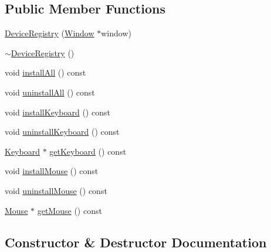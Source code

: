 \subsection*{Public Member Functions}
\begin{DoxyCompactItemize}
\item 
\mbox{\hyperlink{classec_1_1_device_registry_adbe0912caca04d8c401f58b57dc11524}{Device\+Registry}} (\mbox{\hyperlink{classec_1_1_window}{Window}} $\ast$window)
\item 
\mbox{\hyperlink{classec_1_1_device_registry_a75dff0df1527fe9d7e75b25f3dff4028}{$\sim$\+Device\+Registry}} ()
\item 
void \mbox{\hyperlink{classec_1_1_device_registry_a344190c579b44d1238538edb06acd7d7}{install\+All}} () const
\item 
void \mbox{\hyperlink{classec_1_1_device_registry_ab5dc2383c4d5c6f8458f8be914dc7982}{uninstall\+All}} () const
\item 
void \mbox{\hyperlink{classec_1_1_device_registry_aae6852074dd4602f225b1358a2d3d814}{install\+Keyboard}} () const
\item 
void \mbox{\hyperlink{classec_1_1_device_registry_a1ff6b28edf3073f0a483a04bd0b3458d}{uninstall\+Keyboard}} () const
\item 
\mbox{\hyperlink{classec_1_1_keyboard}{Keyboard}} $\ast$ \mbox{\hyperlink{classec_1_1_device_registry_aabbeda3bb4977e230b974c92b6048027}{get\+Keyboard}} () const
\item 
void \mbox{\hyperlink{classec_1_1_device_registry_a8ec9d722e1798e6fd8fddc954f4b2cf0}{install\+Mouse}} () const
\item 
void \mbox{\hyperlink{classec_1_1_device_registry_a18bc5f140735a3f9abd453b89f472f2a}{uninstall\+Mouse}} () const
\item 
\mbox{\hyperlink{classec_1_1_mouse}{Mouse}} $\ast$ \mbox{\hyperlink{classec_1_1_device_registry_a53b0c5d23c851c63ef97529658cd126d}{get\+Mouse}} () const
\end{DoxyCompactItemize}


\subsection{Constructor \& Destructor Documentation}
\mbox{\label{classec_1_1_device_registry_adbe0912caca04d8c401f58b57dc11524}} 
